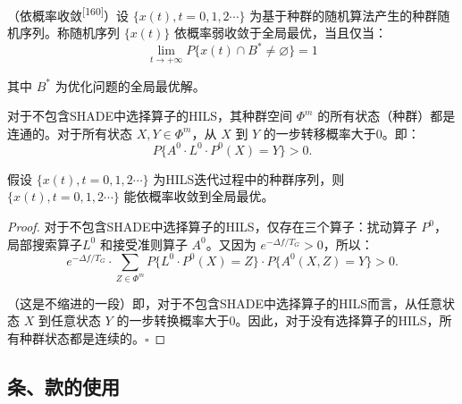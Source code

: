 \begin{definition}
	（依概率收敛\textsuperscript{[160]}）设 $ \{x(t),t=0,1,2 \cdots \} $ 为基于种群的随机算法产生的种群随机序列。称随机序列 $ \{x(t)\} $ 依概率弱收敛于全局最优，当且仅当：	
	\begin{equation}
		\label{equ:chap5:equation1}
		\lim_{t \to +\infty}P\{x(t) \cap B^* \neq \varnothing\}=1
	\end{equation}
	
	\noindent 其中 $ B^* $ 为优化问题的全局最优解。
\end{definition}
	
\begin{nature}
	对于不包含SHADE中选择算子的HILS，其种群空间 $ \varPhi^m $ 的所有状态（种群）都是连通的。对于所有状态 $ X,Y \in \varPhi^m $，从 $ X $ 到 $ Y $ 的一步转移概率大于0。即：
	\begin{equation}
		\label{equ:chap5:nature1}
		P\{A^0 \cdot L^0 \cdot P^0 (X)=Y\}>0. 
	\end{equation}
\end{nature}

\begin{theorem}
	\label{sec:theorem}
	假设 $ \{x(t),t=0,1,2 \cdots\} $ 为HILS迭代过程中的种群序列，则 $ \{x(t),t=0,1,2 \cdots\} $ 能依概率收敛到全局最优。
\end{theorem}

\begin{proof}
	对于不包含SHADE中选择算子的HILS，仅存在三个算子：扰动算子 $ P^0 $，局部搜索算子$  L^0 $ 和接受准则算子 $ A^0 $。又因为 $ e^{- \Delta f / T_G}>0 $，所以：
	\begin{equation}
		\label{equ:chap5:proof1_3}
		e^{- \Delta f/T_G}  \cdot \sum_{Z \in \varPhi^m}P\{L^0 \cdot P^0 (X)=Z\} \cdot P\{A^0 (X,Z)=Y\}>0.
	\end{equation}
	
	\noindent （这是不缩进的一段）即，对于不包含SHADE中选择算子的HILS而言，从任意状态 $ X $ 到任意状态 $ Y $ 的一步转换概率大于0。因此，对于没有选择算子的HILS，所有种群状态都是连续的。\hfill $ \square $
\end{proof}

\subsection{条、款的使用}

